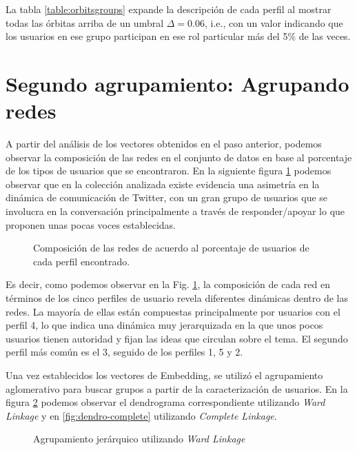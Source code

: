 La tabla \ref{table:orbitsgroups} expande la descripción de cada perfil al mostrar todas las órbitas arriba de un umbral $\Delta = 0.06$, i.e., con un valor indicando que los usuarios en ese grupo participan en ese rol particular más del 5\% de las veces. 

\section{Segundo agrupamiento: Agrupando redes}
\label{sec:experiments:clustering}

A partir del análisis de los vectores obtenidos en el paso anterior, podemos observar la composición de las redes en el conjunto de datos en base al porcentaje de los tipos de usuarios que se encontraron. En la siguiente figura \ref{fig:composition} podemos observar que en la colección analizada existe evidencia una asimetría en la dinámica de comunicación de Twitter, con un gran grupo de usuarios que se involucra en la conversación principalmente a través de responder/apoyar lo que proponen unas pocas voces establecidas.  

 \begin{figure}[htbp]
   \centering
   
    \caption{Composición de las redes de acuerdo al porcentaje de usuarios de cada perfil encontrado.}
    \label{fig:composition}
\end{figure}

Es decir, como podemos observar en la Fig. \ref{fig:composition}, la composición de cada red en términos de los cinco perfiles de usuario revela diferentes dinámicas dentro de las redes. La mayoría de ellas están compuestas principalmente por usuarios con el perfil 4, lo que indica una dinámica muy jerarquizada en la que unos pocos usuarios tienen autoridad y fijan las ideas que circulan sobre el tema. El segundo perfil más común es el 3, seguido de los perfiles 1, 5 y 2.

Una vez establecidos los vectores de Embedding, se utilizó  el agrupamiento aglomerativo para buscar grupos a partir de la caracterización de usuarios. En la figura \ref{fig:dendro-ward} podemos observar el dendrograma correspondiente utilizando \textit{Ward Linkage} y en \ref{fig:dendro-complete} utilizando \textit{Complete Linkage}.

 \begin{figure}[htbp]
   \centering
   
    \caption{Agrupamiento jerárquico utilizando \textit{Ward Linkage}}
    \label{fig:dendro-ward}
\end{figure}

